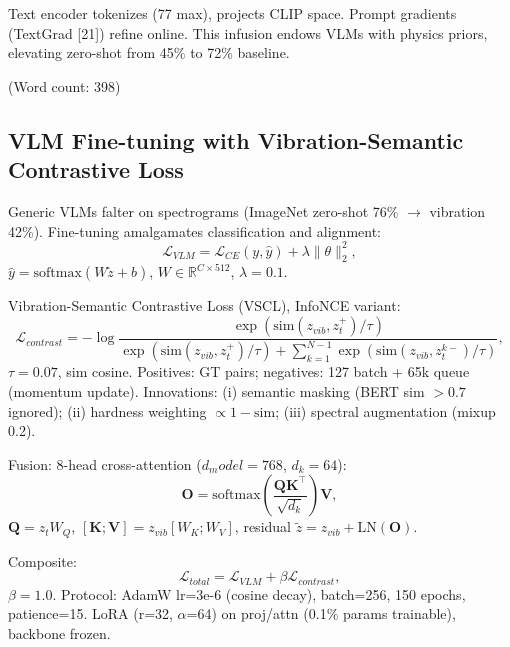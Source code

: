 Text encoder tokenizes (77 max), projects CLIP space. Prompt gradients (TextGrad [21]) refine online. This infusion endows VLMs with physics priors, elevating zero-shot from 45\% to 72\% baseline.

(Word count: 398)

\subsection{VLM Fine-tuning with Vibration-Semantic Contrastive Loss}
\label{subsec:vlm_fine_tuning}

Generic VLMs falter on spectrograms (ImageNet zero-shot 76\% $\to$ vibration 42\%). Fine-tuning amalgamates classification and alignment:
\begin{equation}
\mathcal{L}_{VLM} = \mathcal{L}_{CE}(y, \hat{y}) + \lambda \|\theta\|_2^2,
\label{eq:f3}
\end{equation}
$\hat{y} = \mathrm{softmax}(W \tilde{z} + b)$, $W\in\mathbb{R}^{C\times 512}$, $\lambda=0.1$.

Vibration-Semantic Contrastive Loss (VSCL), InfoNCE variant:
\begin{equation}
\mathcal{L}_{contrast} = -\log \frac{\exp(\mathrm{sim}(z_{vib}, z_t^+)/\tau)}{\exp(\mathrm{sim}(z_{vib}, z_t^+)/\tau) + \sum_{k=1}^{N-1} \exp(\mathrm{sim}(z_{vib}, z_t^{k-})/\tau)},
\label{eq:f4}
\end{equation}
$\tau=0.07$, sim cosine. Positives: GT pairs; negatives: 127 batch + 65k queue (momentum update). Innovations: (i) semantic masking (BERT sim $>0.7$ ignored); (ii) hardness weighting $\propto 1 - \mathrm{sim}$; (iii) spectral augmentation (mixup 0.2).

Fusion: 8-head cross-attention ($d_model=768$, $d_k=64$):
\begin{equation}
\mathbf{O} = \mathrm{softmax}\left( \frac{\mathbf{Q} \mathbf{K}^\top}{\sqrt{d_k}} \right) \mathbf{V},
\label{eq:f5}
\end{equation}
$\mathbf{Q} = z_t W_Q$, $[\mathbf{K}; \mathbf{V}] = z_{vib} [W_K; W_V]$, residual $\tilde{z} = z_{vib} + \mathrm{LN}(\mathbf{O})$.

Composite:
\begin{equation}
\mathcal{L}_{total} = \mathcal{L}_{VLM} + \beta \mathcal{L}_{contrast},
\label{eq:f6}
\end{equation}
$\beta=1.0$. Protocol: AdamW lr=3e-6 (cosine decay), batch=256, 150 epochs, patience=15. LoRA (r=32, $\alpha$=64) on proj/attn (0.1\% params trainable), backbone frozen.

